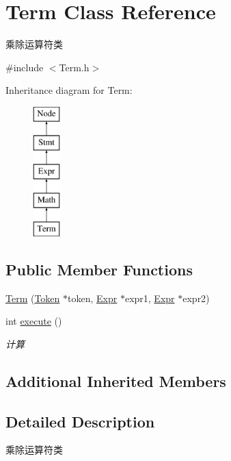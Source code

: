 \hypertarget{class_term}{}\section{Term Class Reference}
\label{class_term}


乘除运算符类  




{\ttfamily \#include $<$Term.\+h$>$}

Inheritance diagram for Term\+:\begin{figure}[H]
\begin{center}
\leavevmode
\includegraphics[height=5.000000cm]{class_term}
\end{center}
\end{figure}
\subsection*{Public Member Functions}
\begin{DoxyCompactItemize}
\item 
\hyperlink{class_term_aee8491368db463879893b7f374d5d835}{Term} (\hyperlink{class_token}{Token} $\ast$token, \hyperlink{class_expr}{Expr} $\ast$expr1, \hyperlink{class_expr}{Expr} $\ast$expr2)
\item 
int \hyperlink{class_term_ac2d20115da73f9425e5d390856a211a1}{execute} ()
\begin{DoxyCompactList}\small\item\em 计算 \end{DoxyCompactList}\end{DoxyCompactItemize}
\subsection*{Additional Inherited Members}


\subsection{Detailed Description}
乘除运算符类 

